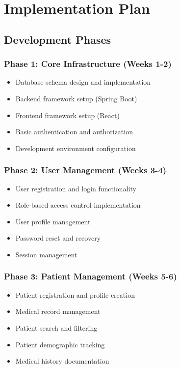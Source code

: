 \documentclass[12pt,a4paper]{article}
\begin{document}
\section{Implementation Plan}

\subsection{Development Phases}

\subsubsection{Phase 1: Core Infrastructure (Weeks 1-2)}
\begin{itemize}
    \item Database schema design and implementation
    \item Backend framework setup (Spring Boot)
    \item Frontend framework setup (React)
    \item Basic authentication and authorization
    \item Development environment configuration
\end{itemize}

\subsubsection{Phase 2: User Management (Weeks 3-4)}
\begin{itemize}
    \item User registration and login functionality
    \item Role-based access control implementation
    \item User profile management
    \item Password reset and recovery
    \item Session management
\end{itemize}

\subsubsection{Phase 3: Patient Management (Weeks 5-6)}
\begin{itemize}
    \item Patient registration and profile creation
    \item Medical record management
    \item Patient search and filtering
    \item Patient demographic tracking
    \item Medical history documentation
\end{itemize}
\end{document}
